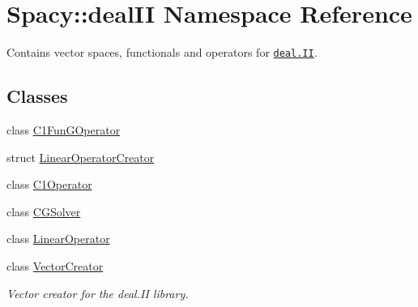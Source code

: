 \hypertarget{namespaceSpacy_1_1dealII}{\section{\-Spacy\-:\-:deal\-I\-I \-Namespace \-Reference}
\label{namespaceSpacy_1_1dealII}
}


\-Contains vector spaces, functionals and operators for \href{www.deal.org}{\tt deal.\-I\-I}.  


\subsection*{\-Classes}
\begin{DoxyCompactItemize}
\item 
class \hyperlink{classSpacy_1_1dealII_1_1C1FunGOperator}{\-C1\-Fun\-G\-Operator}
\item 
struct \hyperlink{structSpacy_1_1dealII_1_1LinearOperatorCreator}{\-Linear\-Operator\-Creator}
\item 
class \hyperlink{classSpacy_1_1dealII_1_1C1Operator}{\-C1\-Operator}
\item 
class \hyperlink{classSpacy_1_1dealII_1_1CGSolver}{\-C\-G\-Solver}
\item 
class \hyperlink{classSpacy_1_1dealII_1_1LinearOperator}{\-Linear\-Operator}
\item 
class \hyperlink{classSpacy_1_1dealII_1_1VectorCreator}{\-Vector\-Creator}
\begin{DoxyCompactList}\small\item\em \-Vector creator for the deal.\-I\-I library. \end{DoxyCompactList}\end{DoxyCompactItemize}
